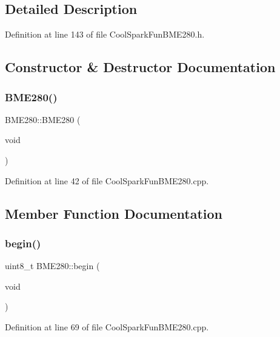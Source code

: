 \subsection{Detailed Description}


Definition at line 143 of file Cool\+Spark\+Fun\+B\+M\+E280.\+h.



\subsection{Constructor \& Destructor Documentation}
\mbox{\label{class_b_m_e280_a9b9354e010528a0c3d452aa2459b808c}} 
\subsubsection{\texorpdfstring{B\+M\+E280()}{BME280()}}
{\footnotesize\ttfamily B\+M\+E280\+::\+B\+M\+E280 (\begin{DoxyParamCaption}\item[{void}]{ }\end{DoxyParamCaption})}



Definition at line 42 of file Cool\+Spark\+Fun\+B\+M\+E280.\+cpp.



\subsection{Member Function Documentation}
\mbox{\label{class_b_m_e280_a994c102f010547f9c740a338ef9905c7}} 
\subsubsection{\texorpdfstring{begin()}{begin()}}
{\footnotesize\ttfamily uint8\+\_\+t B\+M\+E280\+::begin (\begin{DoxyParamCaption}\item[{void}]{ }\end{DoxyParamCaption})}



Definition at line 69 of file Cool\+Spark\+Fun\+B\+M\+E280.\+cpp.

